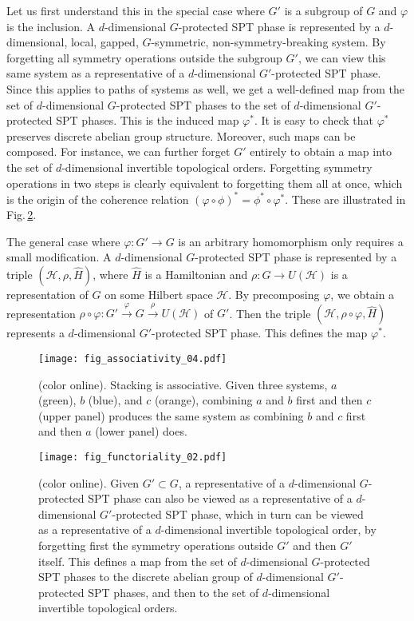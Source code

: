 \documentclass[sort&compress]{elsarticle}
\theoremstyle{theoremstyle}
\theoremstyle{framedtheoremstyle}
\theoremstyle{definitionstyle}
\theoremstyle{definitionstyle}
\theoremstyle{definitionstyle}
\theoremstyle{definitionstyle}
\theoremstyle{nameddefinitionstyle}
\theoremstyle{framednameddefinitionstyle}
\theoremstyle{proofstyle}
\theoremstyle{definitionstyle}
\newcommand{\fromto}{\rightarrow}
\newcommand{\xfromto}[1]{\xrightarrow{#1}}
\newcommand{\paren}[1]{\left( #1 \right)}
\begin{document}
Let us first understand this in the special case where $G'$ is a subgroup of $G$ and $\varphi$ is the inclusion. A $d$-dimensional $G$-protected SPT phase is represented by a $d$-dimensional, local, gapped, $G$-symmetric, non-symmetry-breaking system. By forgetting all symmetry operations outside the subgroup $G'$, we can view this same system as a representative of a $d$-dimensional $G'$-protected SPT phase. Since this applies to paths of systems as well, we get a well-defined map from the set of $d$-dimensional $G$-protected SPT phases to the set of $d$-dimensional $G'$-protected SPT phases. This is the induced map $\varphi^\ast$. It is easy to check that $\varphi^\ast$ preserves discrete abelian group structure. Moreover, such maps can be composed. For instance, we can further forget $G'$ entirely to obtain a map into the set of $d$-dimensional invertible topological orders. Forgetting symmetry operations in two steps is clearly equivalent to forgetting them all at once, which is the origin of the coherence relation $(\varphi \circ \phi)^\ast = \phi^\ast \circ \varphi^\ast$. These are illustrated in Fig.\,\ref{fig:functoriality}.

The general case where $\varphi: G' \fromto G$ is an arbitrary homomorphism only requires a small modification. A $d$-dimensional $G$-protected SPT phase is represented by a triple $\paren{\mathscr H, \rho, \hat H}$, where $\hat H$ is a Hamiltonian and $\rho: G \fromto U(\mathscr H)$ is a representation of $G$ on some Hilbert space $\mathscr H$. By precomposing $\varphi$, we obtain a representation $\rho \circ \varphi: G' \xfromto{\varphi} G \xfromto{\rho} U(\mathscr H)$ of $G'$. Then the triple $\paren{\mathscr H, \rho\circ \varphi, \hat H}$ represents a $d$-dimensional $G'$-protected SPT phase. This defines the map $\varphi^*$.

\begin{figure}[t]
\centering
\texttt{[image: fig\_associativity\_04.pdf]}
\caption{(color online). Stacking is associative. Given three systems, $a$ (green), $b$ (blue), and $c$ (orange), combining $a$ and $b$ first and then $c$ (upper panel) produces the same system as combining $b$ and $c$ first and then $a$ (lower panel) does.}
\label{fig:associativity}
\end{figure}

\begin{figure}[t]
\centering
\texttt{[image: fig\_functoriality\_02.pdf]}
\caption{(color online). Given $G'\subset G$, a representative of a $d$-dimensional $G$-protected SPT phase can also be viewed as a representative of a $d$-dimensional $G'$-protected SPT phase, which in turn can be viewed as a representative of a $d$-dimensional invertible topological order, by forgetting first the symmetry operations outside $G'$ and then $G'$ itself. This defines a map from the set of $d$-dimensional $G$-protected SPT phases to the discrete abelian group of $d$-dimensional $G'$-protected SPT phases, and then to the set of $d$-dimensional invertible topological orders.}
\label{fig:functoriality}
\end{figure}
\end{document}
